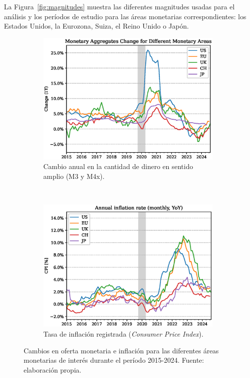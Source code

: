 \documentclass[titlepage, 12pt]{article}
\begin{document}
La Figura~\ref{fig:magnitudes} muestra las diferentes magnitudes usadas para el análisis y los períodos de estudio para las áreas monetarias correspondientes: los Estados Unidos, la Eurozona, Suiza, el Reino Unido o Japón.

\begin{figure}
    \centering
    \begin{subfigure}[b]{0.49\textwidth}
        \includegraphics[width=\textwidth]{plots/money-supply.eps}
        \caption{Cambio anual en la cantidad de dinero en sentido amplio (M3 y M4x).}
    \end{subfigure}
    ~
    \begin{subfigure}[b]{0.49\textwidth}
        \includegraphics[width=\textwidth]{plots/inflation.eps}
        \caption{Tasa de inflación registrada (\textit{Consumer Price Index}).}
    \end{subfigure}
    \caption{Cambios en oferta monetaria e inflación para las diferentes áreas monetarias de interés durante el período 2015-2024. Fuente: elaboración propia.}
    \label{fig:m3-inflation}
\end{figure}
\end{document}
